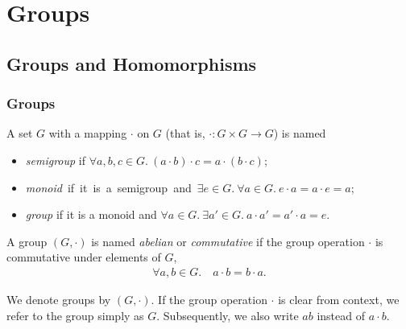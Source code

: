 
\chapter{Groups}\label{cha:groups}
\section{Groups and Homomorphisms}
\subsection{Groups}
\begin{defn}\leavevmode
\begin{defnlist}
    \item A set $G$ with a mapping $\cdot$ on $G$ (that is, $\cdot: G \times G \to G$) is named \begin{itemize}
        \item \emph{semigroup} if $\forall a, b, c \in G.\ (a \cdot b) \cdot c = a \cdot (b \cdot c)$; 
        \item \mbox{\emph{monoid} if it is a semigroup and $\exists e \in G.\ \forall a \in G.\ e \cdot a = a \cdot e = a$; }
        \item \emph{group} if it is a monoid and $\forall a \in G.\ \exists a' \in G.\ a \cdot a' = a' \cdot a = e$. 
    \end{itemize}
    
    \item A group $(G,\cdot)$ is named \emph{abelian} or \emph{commutative} if the group operation $\cdot$ is commutative under elements of $G$, \begin{align}
        \forall a, b \in G.\quad a \cdot b = b \cdot a.
    \end{align}
    
    \begin{marginfigure}
        We denote groups by $(G,\cdot)$. If the group operation $\cdot$ is clear from context, we refer to the group simply as $G$. Subsequently, we also write $a b$ instead of $a \cdot b$.
    \end{marginfigure}
\end{defnlist}
\end{defn}

